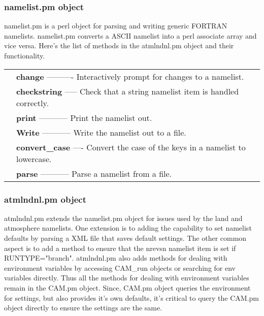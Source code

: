 \documentclass[]{article}
\begin{document}
\subsubsection{namelist.pm object}
namelist.pm is a perl object for parsing and writing generic FORTRAN namelists. namelist.pm
converts a ASCII namelist into a perl associate array and vice versa.
Here's the list of methods in the atmlndnl.pm object and their functionality.\\
\begin{tabular}{r p{3.7in}}
	& {\bf change} ---------- Interactively prompt for changes to a namelist.\\
	& {\bf checkstring} ----- Check that a string namelist item is handled correctly.\\
	& {\bf print} ----------- Print the namelist out.\\
	& {\bf Write} ----------- Write the namelist out to a file.\\
	& {\bf convert\_case} ---- Convert the case of the keys in a namelist to lowercase.\\
	& {\bf parse} ----------- Parse a namelist from a file.\\
\end{tabular}
\subsubsection{atmlndnl.pm object}
atmlndnl.pm extends the namelist.pm object for issues used by the land and atmosphere namelists.
One extension is to adding the capability to set namelist defaults by parsing a XML file that
saves default settings. The other common aspect is to add a method to ensure that the nrevsn
namelist item is set if RUNTYPE="branch". atmlndnl.pm also adds methods for dealing with
environment variables by accessing CAM\_run objects or searching for env variables directly.
Thus all the methods for dealing with environment variables remain in the CAM.pm object.
Since, CAM.pm object queries the environment for settings, but also provides it's own defaults,
it's critical to query the CAM.pm object directly to ensure the settings are the same.
\end{document}
